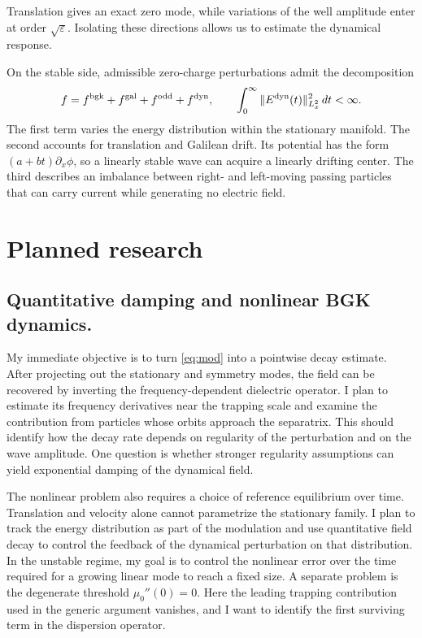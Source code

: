 \documentclass[reqno,10pt,letterpaper]{amsart}
\numberwithin{equation}{section}
\begin{document}
Translation gives an exact zero mode, while variations of the well amplitude enter at order $\sqrt{\varepsilon}$. Isolating these directions allows us to estimate the dynamical response.

On the stable side, admissible zero-charge perturbations admit the decomposition
\begin{equation}\label{eq:mod}
 f=f^{\rm bgk}+f^{\rm gal}+f^{\rm odd}+f^{\rm dyn},\qquad
 \int_0^\infty \|E^{\rm dyn}(t)\|_{L_x^2}^2\,dt<\infty .
\end{equation}
The first term varies the energy distribution within the stationary manifold. The second accounts for translation and Galilean drift. Its potential has the form $(a+bt)\partial_x\phi$, so a linearly stable wave can acquire a linearly drifting center. The third describes an imbalance between right- and left-moving passing particles that can carry current while generating no electric field.

\section{Planned research}

\subsection{Quantitative damping and nonlinear BGK dynamics.}
My immediate objective is to turn \eqref{eq:mod} into a pointwise decay estimate. After projecting out the stationary and symmetry modes, the field can be recovered by inverting the frequency-dependent dielectric operator. I plan to estimate its frequency derivatives near the trapping scale and examine the contribution from particles whose orbits approach the separatrix. This should identify how the decay rate depends on regularity of the perturbation and on the wave amplitude. One question is whether stronger regularity assumptions can yield exponential damping of the dynamical field.

The nonlinear problem also requires a choice of reference equilibrium over time. Translation and velocity alone cannot parametrize the stationary family. I plan to track the energy distribution as part of the modulation and use quantitative field decay to control the feedback of the dynamical perturbation on that distribution. In the unstable regime, my goal is to control the nonlinear error over the time required for a growing linear mode to reach a fixed size. A separate problem is the degenerate threshold $\mu_0''(0)=0$. Here the leading trapping contribution used in the generic argument vanishes, and I want to identify the first surviving term in the dispersion operator.
\end{document}
